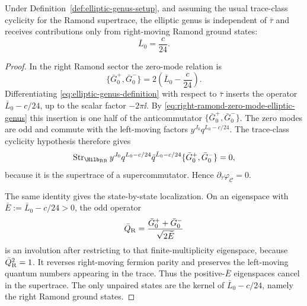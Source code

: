 \begin{proposition}
\label{prop:elliptic-genus-right-moving-localization}
Under Definition~\ref{def:elliptic-genus-setup}, and assuming the usual
trace-class cyclicity for the Ramond supertrace, the elliptic genus is
independent of \(\bar\tau\) and receives contributions only from right-moving
Ramond ground states:
\begin{equation}
  \bar L_0=\frac c{24}.
  \label{eq:elliptic-genus-right-ground-condition}
\end{equation}
\end{proposition}

\begin{proof}
In the right Ramond sector the zero-mode relation is
\begin{equation}
  \{\bar G^+_0,\bar G^-_0\}
  =
  2\left(\bar L_0-\frac c{24}\right).
  \label{eq:right-ramond-zero-mode-elliptic-genus}
\end{equation}
Differentiating \eqref{eq:elliptic-genus-definition} with respect to
\(\bar\tau\) inserts the operator \(\bar L_0-c/24\), up to the scalar factor
\(-2\pi\ii\).  By \eqref{eq:right-ramond-zero-mode-elliptic-genus} this
insertion is one half of the anticommutator
\(\{\bar G^+_0,\bar G^-_0\}\).  The zero modes are odd and commute with the
left-moving factors \(y^{J_0}q^{L_0-c/24}\).  The trace-class cyclicity
hypothesis therefore gives
\[
  \operatorname{Str}_{\Hilb_{\rm RR}}
  y^{J_0}q^{L_0-c/24}\bar q^{\bar L_0-c/24}
  \{\bar G^+_0,\bar G^-_0\}
  =
  0,
\]
because it is the supertrace of a supercommutator.  Hence
\(\partial_{\bar\tau}\varphi_{\mathcal C}=0\).

The same identity gives the state-by-state localization.  On an eigenspace
with \(\bar E:=\bar L_0-c/24>0\), the odd operator
\[
  \bar Q_{\rm R}=\frac{\bar G^+_0+\bar G^-_0}{\sqrt{2\bar E}}
\]
is an involution after restricting to that finite-multiplicity eigenspace,
because \(\bar Q_{\rm R}^2=1\).  It reverses right-moving fermion parity and
preserves the left-moving quantum numbers appearing in the trace.  Thus the
positive-\(\bar E\) eigenspaces cancel in the supertrace.  The only unpaired
states are the kernel of \(\bar L_0-c/24\), namely the right Ramond ground
states.
\end{proof}

